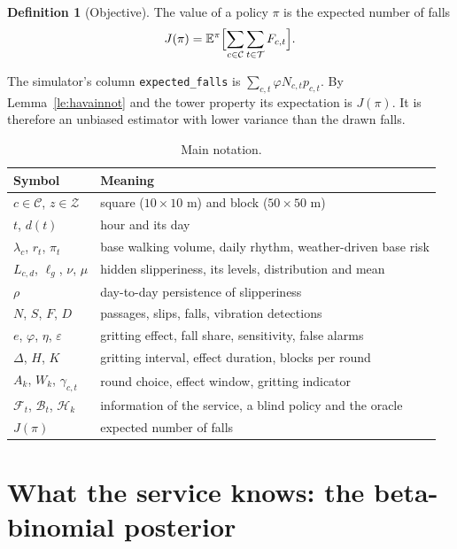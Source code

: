 \documentclass[11pt,a4paper]{article}
\theoremstyle{plain}
\theoremstyle{definition}
\newtheorem{maaritelma}{Definition}
\theoremstyle{remark}
\newcommand{\E}{\mathbb{E}}
\newcommand{\cC}{\mathcal{C}}
\newcommand{\cZ}{\mathcal{Z}}
\newcommand{\cT}{\mathcal{T}}
\newcommand{\cF}{\mathcal{F}}
\newcommand{\cB}{\mathcal{B}}
\newcommand{\cH}{\mathcal{H}}
\newcommand{\1}{\mathbf{1}}
\begin{document}
\begin{maaritelma}[Objective]
The value of a policy $\pi$ is the expected number of falls
\[
  J(\pi) = \E^\pi\Bigl[\sum_{c \in \cC} \sum_{t \in \cT} F_{c,t}\Bigr].
\]
\end{maaritelma}

The simulator's column \texttt{expected\_falls} is
$\sum_{c,t} \varphi N_{c,t} p_{c,t}$. By Lemma~\ref{le:havainnot} and the tower
property its expectation is $J(\pi)$. It is therefore an unbiased estimator with
lower variance than the drawn falls.

\begin{table}[ht]
\centering
\small
\begin{tabular}{@{}l l@{}}
\toprule
Symbol & Meaning \\
\midrule
$c \in \cC$, $z \in \cZ$ & square ($10 \times 10$ m) and block ($50 \times 50$ m) \\
$t$, $d(t)$ & hour and its day \\
$\lambda_c$, $r_t$, $\pi_t$ & base walking volume, daily rhythm, weather-driven base risk \\
$L_{c,d}$, $\ell_g$, $\nu$, $\mu$ & hidden slipperiness, its levels, distribution and mean \\
$\rho$ & day-to-day persistence of slipperiness \\
$N$, $S$, $F$, $D$ & passages, slips, falls, vibration detections \\
$e$, $\varphi$, $\eta$, $\varepsilon$ & gritting effect, fall share, sensitivity, false alarms \\
$\Delta$, $H$, $K$ & gritting interval, effect duration, blocks per round \\
$A_k$, $W_k$, $\gamma_{c,t}$ & round choice, effect window, gritting indicator \\
$\cF_t$, $\cB_t$, $\cH_k$ & information of the service, a blind policy and the oracle \\
$J(\pi)$ & expected number of falls \\
\bottomrule
\end{tabular}
\caption{Main notation.}
\label{tab:merkinnat}
\end{table}

\section{What the service knows: the beta-binomial posterior}\label{sec:posteriori}
\end{document}
